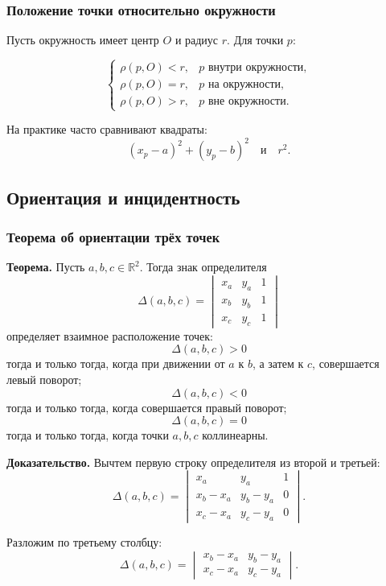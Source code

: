 \documentclass[12pt,a4paper]{article}
\begin{document}
\subsubsection{Положение точки относительно окружности}

Пусть окружность имеет центр \(O\) и радиус \(r\). Для точки \(p\):

\[
\begin{cases}
\rho(p,O)<r, & p \text{ внутри окружности},\\
\rho(p,O)=r, & p \text{ на окружности},\\
\rho(p,O)>r, & p \text{ вне окружности}.
\end{cases}
\]

На практике часто сравнивают квадраты:
\[
(x_p-a)^2+(y_p-b)^2
\quad\text{и}\quad
r^2.
\]

\subsection{Ориентация и инцидентность}

\subsubsection{Теорема об ориентации трёх точек}

\textbf{Теорема.}
Пусть \(a,b,c\in\mathbb{R}^2\). Тогда знак определителя
\[
\Delta(a,b,c)
=
\begin{vmatrix}
x_a & y_a & 1\\
x_b & y_b & 1\\
x_c & y_c & 1
\end{vmatrix}
\]
определяет взаимное расположение точек:
\[
\Delta(a,b,c)>0
\]
тогда и только тогда, когда при движении от \(a\) к \(b\), а затем к \(c\), совершается левый поворот;
\[
\Delta(a,b,c)<0
\]
тогда и только тогда, когда совершается правый поворот;
\[
\Delta(a,b,c)=0
\]
тогда и только тогда, когда точки \(a,b,c\) коллинеарны.

\textbf{Доказательство.}
Вычтем первую строку определителя из второй и третьей:
\[
\Delta(a,b,c)
=
\begin{vmatrix}
x_a & y_a & 1\\
x_b-x_a & y_b-y_a & 0\\
x_c-x_a & y_c-y_a & 0
\end{vmatrix}.
\]

Разложим по третьему столбцу:
\[
\Delta(a,b,c)
=
\begin{vmatrix}
x_b-x_a & y_b-y_a\\
x_c-x_a & y_c-y_a
\end{vmatrix}.
\]
\end{document}
